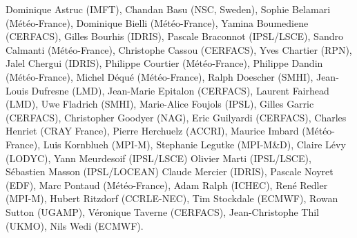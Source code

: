 Dominique Astruc (IMFT),
Chandan Basu (NSC, Sweden),
Sophie Belamari (M\'et\'eo-France),
Dominique Bielli (M\'et\'eo-France),
Yamina Boumediene (CERFACS), 
Gilles Bourhis (IDRIS),
Pascale Braconnot (IPSL/LSCE),
Sandro Calmanti (M\'et\'eo-France),
Christophe Cassou (CERFACS),
Yves Chartier (RPN),
Jalel Chergui (IDRIS),
Philippe Courtier (M\'et\'eo-France),
Philippe Dandin (M\'et\'eo-France),
Michel D\'equ\'e (M\'et\'eo-France),
Ralph Doescher (SMHI),
Jean-Louis Dufresne (LMD),
Jean-Marie Epitalon (CERFACS),
Laurent Fairhead (LMD),
Uwe Fladrich (SMHI),
Marie-Alice Foujols (IPSL),
Gilles Garric (CERFACS),
Christopher Goodyer (NAG),
Eric Guilyardi (CERFACS),
Charles Henriet (CRAY France),
Pierre Herchuelz (ACCRI),
Maurice Imbard (M\'et\'eo-France),
Luis Kornblueh (MPI-M),
Stephanie Legutke (MPI-M\&D),
Claire L\'evy (LODYC),
Yann Meurdesoif (IPSL/LSCE)
Olivier Marti (IPSL/LSCE),
S\'ebastien Masson (IPSL/LOCEAN)
Claude Mercier (IDRIS),
Pascale Noyret (EDF),
Marc Pontaud (M\'et\'eo-France),
Adam Ralph (ICHEC),
Ren\'e Redler (MPI-M),
Hubert Ritzdorf (CCRLE-NEC),
Tim Stockdale (ECMWF),
Rowan Sutton (UGAMP),
V\'eronique Taverne (CERFACS),
Jean-Christophe Thil (UKMO),
Nils Wedi (ECMWF).



